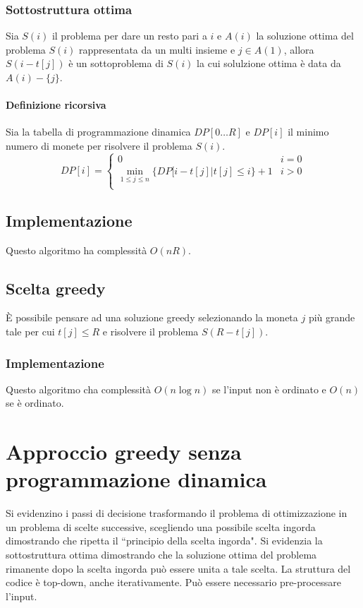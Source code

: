 \subsubsection{Sottostruttura ottima}
Sia $S(i)$ il problema per dare un resto pari a $i$ e $A(i)$ la soluzione ottima del problema $S(i)$ rappresentata da un multi insieme e $j\in A(1)$, allora $S(i-t[j])$ \`e un 
sottoproblema di $S(i)$ la cui solulzione ottima \`e data da $A(i)-\{j\}$. 
\paragraph{Definizione ricorsiva}
Sia la tabella di programmazione dinamica $DP[0\dots R]$ e $DP[i]$ il minimo numero di monete per risolvere il problema $S(i)$.
$$DP[i] = \begin{cases}
	0 & i = 0 \\
	\min\limits_{1\le j\le n}\{DP[i-t[j] | t[j]\le i\} + 1 & i>0\\
\end{cases}$$
\subsection{Implementazione}

Questo algoritmo ha complessit\`a $O(nR)$. 
\subsection{Scelta greedy}
\`E possibile pensare ad una soluzione greedy selezionando la moneta $j$ pi\`u grande tale per cui $t[j]\le R$ e risolvere il problema $S(R - t[j])$. 
\subsubsection{Implementazione}

Questo algoritmo cha complessit\`a $O(n\log n)$ se l'input non \`e ordinato e $O(n)$ se \`e ordinato.
\section{Approccio greedy senza programmazione dinamica}
Si evidenzino i passi di decisione trasformando il problema di ottimizzazione in un problema di scelte successive, scegliendo una possibile scelta ingorda dimostrando che ripetta il
``principio della scelta ingorda". Si evidenzia la sottostruttura ottima dimostrando che la soluzione ottima del problema rimanente dopo la scelta ingorda pu\`o essere unita a tale
scelta. La struttura del codice \`e top-down, anche iterativamente. Pu\`o essere necessario pre-processare l'input. 
